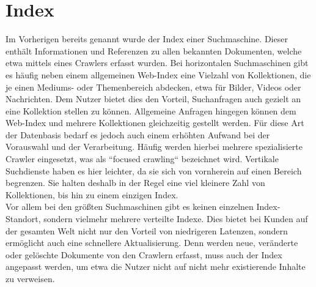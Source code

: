 \section{Index}
\label{sec:Index}
Im Vorherigen bereits genannt wurde der Index einer Suchmaschine. Dieser enthält Informationen und Referenzen zu allen bekannten Dokumenten, welche etwa mittels eines Crawlers erfasst wurden. Bei horizontalen Suchmaschinen gibt es häufig neben einem allgemeinen Web-Index eine Vielzahl von Kollektionen, die je einen Mediums- oder Themenbereich abdecken, etwa für Bilder, Videos oder Nachrichten. Dem Nutzer bietet dies den Vorteil, Suchanfragen auch gezielt an eine Kollektion stellen zu können. Allgemeine Anfragen hingegen können dem Web-Index und mehrere Kollektionen gleichzeitig gestellt werden. Für diese Art der Datenbasis bedarf es jedoch auch einem erhöhten Aufwand bei der Vorauswahl und der Verarbeitung. Häufig werden hierbei mehrere spezialisierte Crawler eingesetzt, was als ``focused crawling`` bezeichnet wird. Vertikale Suchdienste haben es hier leichter, da sie sich von vornherein auf einen Bereich begrenzen. Sie halten deshalb in der Regel eine viel kleinere Zahl von Kollektionen, bis hin zu einem einzigen Index. \cite{suchmverst}\\
Vor allem bei den größten Suchmaschinen gibt es keinen einzelnen Index-Standort, sondern vielmehr mehrere verteilte Indexe. Dies bietet bei Kunden auf der gesamten Welt nicht nur den Vorteil von niedrigeren Latenzen, sondern ermöglicht auch eine schnellere Aktualisierung. Denn werden neue, veränderte oder gelöschte Dokumente von den Crawlern erfasst, muss auch der Index angepasst werden, um etwa die Nutzer nicht auf nicht mehr existierende Inhalte zu verweisen. \cite{suchmverst} \cite{wikiindex}

